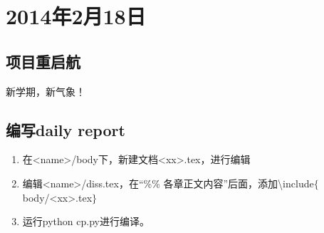 \chapter{2014年2月18日}
\section{项目重启航}
新学期，新气象！
\section{编写daily report}
\begin{enumerate}
  \item 在<name>/body下，新建文档<xx>.tex，进行编辑
  \item 编辑<name>/diss.tex，在“\%\% 各章正文内容”后面，添加\textbackslash include$\{$body/<xx>.tex$\}$
  \item 运行python cp.py进行编译。
\end{enumerate}
